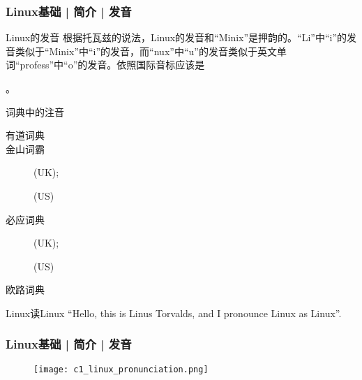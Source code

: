 \begin{frame}
  \frametitle{Linux基础 | 简介 | 发音}
  \begin{block}{Linux的发音}
  根据托瓦兹的说法，Linux的发音和“Minix”是押韵的。“Li”中“i”的发音类似于“Minix”中“i”的发音，而“nux”中“u”的发音类似于英文单词“profess”中“o”的发音。依照国际音标应该是\begin{IPA}[tt]['lIn@ks]\end{IPA}。
  \end{block}
  \pause
  \begin{block}{词典中的注音}
    \begin{description}
      \item[有道词典] \begin{IPA}[tt]['lIn@ks]\end{IPA}
      \item[金山词霸] \begin{IPA}[tt]['lIn@ks]\end{IPA}(UK); \begin{IPA}[tt]['lIn@ks]\end{IPA}(US)
      \item[必应词典] \begin{IPA}[tt]['lIn@ks]\end{IPA}(UK); \begin{IPA}[tt]['laIn2ks]\end{IPA}(US)
      \item[欧路词典] \begin{IPA}[tt]['laIn2ks]\end{IPA}
    \end{description}
  \end{block}
  \pause
  \begin{block}{Linux读Linux}
    ``Hello, this is Linus Torvalds, and I pronounce Linux as Linux''.
  \end{block}
\end{frame}

\begin{frame}
  \frametitle{Linux基础 | 简介 | 发音}
  \begin{figure}
    \centering
    \texttt{[image: c1\_linux\_pronunciation.png]}
  \end{figure}
\end{frame}


